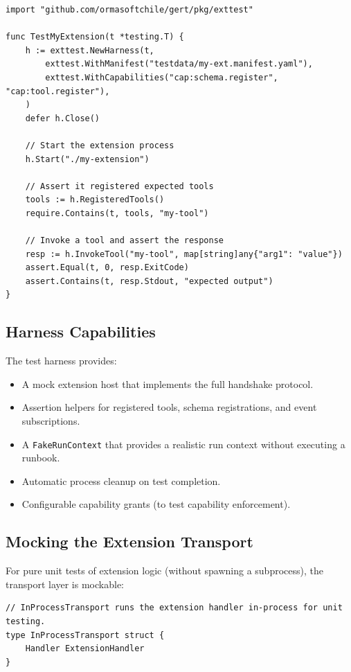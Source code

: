 \begin{verbatim}
import "github.com/ormasoftchile/gert/pkg/exttest"

func TestMyExtension(t *testing.T) {
    h := exttest.NewHarness(t,
        exttest.WithManifest("testdata/my-ext.manifest.yaml"),
        exttest.WithCapabilities("cap:schema.register", "cap:tool.register"),
    )
    defer h.Close()

    // Start the extension process
    h.Start("./my-extension")

    // Assert it registered expected tools
    tools := h.RegisteredTools()
    require.Contains(t, tools, "my-tool")

    // Invoke a tool and assert the response
    resp := h.InvokeTool("my-tool", map[string]any{"arg1": "value"})
    assert.Equal(t, 0, resp.ExitCode)
    assert.Contains(t, resp.Stdout, "expected output")
}
\end{verbatim}

\subsection{Harness Capabilities}

The test harness provides:

\begin{itemize}
  \item A mock extension host that implements the full handshake protocol.
  \item Assertion helpers for registered tools, schema registrations, and event subscriptions.
  \item A \texttt{FakeRunContext} that provides a realistic run context without executing a runbook.
  \item Automatic process cleanup on test completion.
  \item Configurable capability grants (to test capability enforcement).
\end{itemize}

\subsection{Mocking the Extension Transport}

For pure unit tests of extension logic (without spawning a subprocess), the transport layer is mockable:

\begin{verbatim}
// InProcessTransport runs the extension handler in-process for unit testing.
type InProcessTransport struct {
    Handler ExtensionHandler
}
\end{verbatim}

